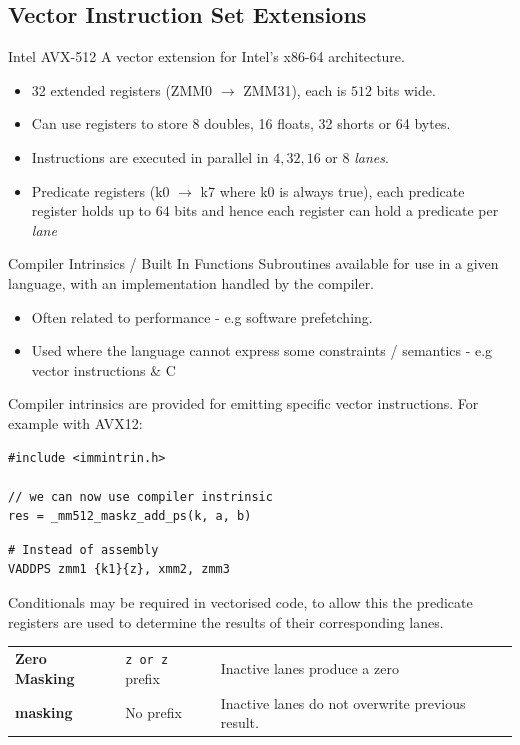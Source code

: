 \subsection{Vector Instruction Set Extensions}
\begin{definitionbox}{Intel AVX-512}
    A vector extension for Intel's x86-64 architecture.
    \begin{itemize}
        \item 32 extended registers (ZMM0 $\to$ ZMM31), each is $512$ bits wide.
        \item Can use registers to store 8 doubles, 16 floats, 32 shorts or 64 bytes.
        \item Instructions are executed in parallel in $4,32,16$ or $8$ \textit{lanes}.
        \item Predicate registers (k0 $\to$ k7 where k0 is always true), each predicate register holds up to $64$ bits and hence each register can hold a predicate per \textit{lane}
    \end{itemize}
\end{definitionbox}

\begin{definitionbox}{Compiler Intrinsics / Built In Functions}
    Subroutines available for use in a given language, with an implementation handled by the compiler.
    \begin{itemize}
        \item Often related to performance - e.g software prefetching.
        \item Used where the language cannot express some constraints / semantics - e.g vector instructions \& C
    \end{itemize}
\end{definitionbox}

Compiler intrinsics are provided for emitting specific vector instructions. For example with AVX12:
\begin{verbatim}
#include <immintrin.h>

// we can now use compiler instrinsic
res = _mm512_maskz_add_ps(k, a, b)
\end{verbatim}
\begin{verbatim}
# Instead of assembly
VADDPS zmm1 {k1}{z}, xmm2, zmm3
\end{verbatim}
Conditionals may be required in vectorised code, to allow this the predicate registers are used to determine the results of their corresponding lanes.
\begin{center}
    \begin{tabular}{l l p{}}
        \textbf{Zero Masking} & \texttt{z or {z}} prefix & Inactive lanes produce a zero \\
        \textbf{masking} & No prefix & Inactive lanes do not overwrite previous result. \\
    \end{tabular}
\end{center}

